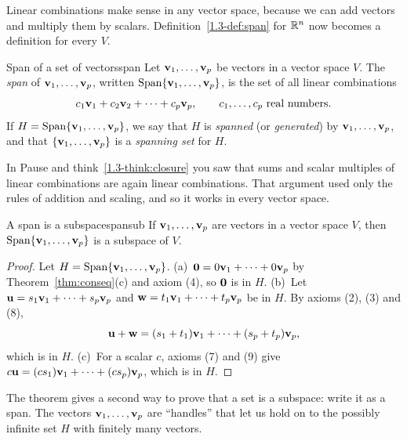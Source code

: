 \documentclass[11pt]{article}
\begin{document}
Linear combinations make sense in any vector space, because we can add vectors and multiply them by scalars. Definition~\ref{1.3-def:span} for $\mathbb{R}^n$ now becomes a definition for every $V$.

\begin{defn}{Span of a set of vectors}{span}
Let $\mathbf{v}_1,\dots,\mathbf{v}_p$ be vectors in a vector space $V$. The \emph{span} of $\mathbf{v}_1,\dots,\mathbf{v}_p$, written $\operatorname{Span}\{\mathbf{v}_1,\dots,\mathbf{v}_p\}$, is the set of all linear combinations
\[
c_1\mathbf{v}_1+c_2\mathbf{v}_2+\cdots+c_p\mathbf{v}_p,\qquad c_1,\dots,c_p\text{ real numbers}.
\]
If $H=\operatorname{Span}\{\mathbf{v}_1,\dots,\mathbf{v}_p\}$, we say that $H$ is \emph{spanned} (or \emph{generated}) by $\mathbf{v}_1,\dots,\mathbf{v}_p$, and that $\{\mathbf{v}_1,\dots,\mathbf{v}_p\}$ is a \emph{spanning set} for $H$.
\end{defn}

In Pause and think~\ref{1.3-think:closure} you saw that sums and scalar multiples of linear combinations are again linear combinations. That argument used only the rules of addition and scaling, and so it works in every vector space.

\begin{thm}{A span is a subspace}{spansub}
If $\mathbf{v}_1,\dots,\mathbf{v}_p$ are vectors in a vector space $V$, then $\operatorname{Span}\{\mathbf{v}_1,\dots,\mathbf{v}_p\}$ is a subspace of $V$.
\end{thm}

\begin{proof}
Let $H=\operatorname{Span}\{\mathbf{v}_1,\dots,\mathbf{v}_p\}$. (a)~$\mathbf{0}=0\mathbf{v}_1+\cdots+0\mathbf{v}_p$ by Theorem~\ref{thm:conseq}(c) and axiom (4), so $\mathbf{0}$ is in $H$. (b)~Let $\mathbf{u}=s_1\mathbf{v}_1+\cdots+s_p\mathbf{v}_p$ and $\mathbf{w}=t_1\mathbf{v}_1+\cdots+t_p\mathbf{v}_p$ be in $H$. By axioms (2), (3) and (8),
\[
\mathbf{u}+\mathbf{w}=(s_1+t_1)\mathbf{v}_1+\cdots+(s_p+t_p)\mathbf{v}_p,
\]
which is in $H$. (c)~For a scalar $c$, axioms (7) and (9) give $c\mathbf{u}=(cs_1)\mathbf{v}_1+\cdots+(cs_p)\mathbf{v}_p$, which is in $H$.
\end{proof}

The theorem gives a second way to prove that a set is a subspace: write it as a span. The vectors $\mathbf{v}_1,\dots,\mathbf{v}_p$ are ``handles'' that let us hold on to the possibly infinite set $H$ with finitely many vectors.
\end{document}
